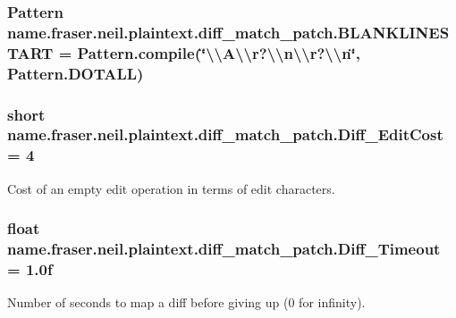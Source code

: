 \subsubsection[{\texorpdfstring{B\+L\+A\+N\+K\+L\+I\+N\+E\+S\+T\+A\+RT}{BLANKLINESTART}}]{\setlength{\rightskip}{0pt plus 5cm}Pattern name.\+fraser.\+neil.\+plaintext.\+diff\+\_\+match\+\_\+patch.\+B\+L\+A\+N\+K\+L\+I\+N\+E\+S\+T\+A\+RT = Pattern.\+compile(\char`\"{}\textbackslash{}\textbackslash{}A\textbackslash{}\textbackslash{}r?\textbackslash{}\textbackslash{}n\textbackslash{}\textbackslash{}r?\textbackslash{}\textbackslash{}n\char`\"{}, Pattern.\+D\+O\+T\+A\+LL)\hspace{0.3cm}{\ttfamily [private]}}\hypertarget{classname_1_1fraser_1_1neil_1_1plaintext_1_1diff__match__patch_a6d4b186e2812cefeb3efc68da2015ea4}{}\label{classname_1_1fraser_1_1neil_1_1plaintext_1_1diff__match__patch_a6d4b186e2812cefeb3efc68da2015ea4}
\subsubsection[{\texorpdfstring{Diff\+\_\+\+Edit\+Cost}{Diff_EditCost}}]{\setlength{\rightskip}{0pt plus 5cm}short name.\+fraser.\+neil.\+plaintext.\+diff\+\_\+match\+\_\+patch.\+Diff\+\_\+\+Edit\+Cost = 4}\hypertarget{classname_1_1fraser_1_1neil_1_1plaintext_1_1diff__match__patch_a28a239224c0ca2c3e8649d6656b14109}{}\label{classname_1_1fraser_1_1neil_1_1plaintext_1_1diff__match__patch_a28a239224c0ca2c3e8649d6656b14109}
Cost of an empty edit operation in terms of edit characters. 
\subsubsection[{\texorpdfstring{Diff\+\_\+\+Timeout}{Diff_Timeout}}]{\setlength{\rightskip}{0pt plus 5cm}float name.\+fraser.\+neil.\+plaintext.\+diff\+\_\+match\+\_\+patch.\+Diff\+\_\+\+Timeout = 1.\+0f}\hypertarget{classname_1_1fraser_1_1neil_1_1plaintext_1_1diff__match__patch_a4edf86105dad04b3c09b83db303d64f8}{}\label{classname_1_1fraser_1_1neil_1_1plaintext_1_1diff__match__patch_a4edf86105dad04b3c09b83db303d64f8}
Number of seconds to map a diff before giving up (0 for infinity). 
